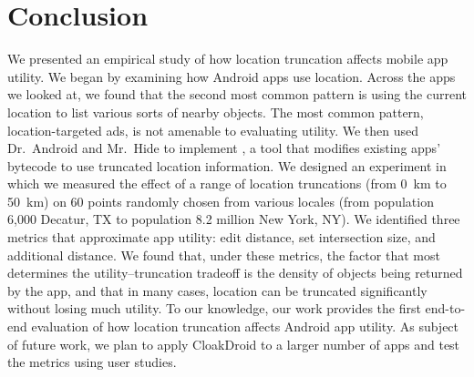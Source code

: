 \section{Conclusion}

We presented an empirical study of how location truncation affects
mobile app utility. We began by examining how Android apps use
location. Across the apps we looked at, we found that the second most
common pattern is using the current location to list various sorts of
nearby objects. The most common pattern, location-targeted ads, is not
amenable to evaluating utility. We then used Dr.~Android and Mr.~Hide
to implement \fuzzer{}, a tool that
modifies existing apps' bytecode to use truncated location
information. We designed an experiment in which we measured the effect
of a range of location truncations (from 0~km to 50~km) on 60
points randomly chosen from various locales (from population 6,000
Decatur, TX to population 8.2 million New York, NY). We identified three
metrics that approximate app utility: edit distance, set intersection
size, and additional distance. We found that, under these metrics, the
factor that most determines the utility--truncation tradeoff is
the density of objects being returned by the app, and that in many
cases, location can be truncated significantly without losing much
utility. To our knowledge, our work provides the first end-to-end
evaluation of how location truncation affects Android app utility.
As subject of future work, we plan to apply CloakDroid to a larger 
number of apps and test the metrics using user studies.
